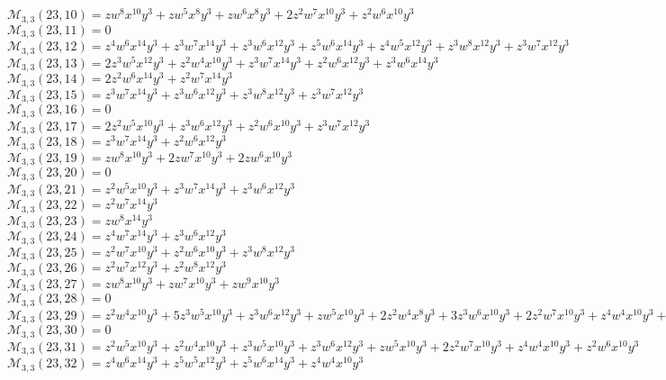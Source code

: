 \documentclass[12pt]{memoireuqam1.3}
\begin{document}
$\mathcal{M}_{3,3}(23,10)=zw^8x^{10}y^3+zw^5x^8y^3+zw^6x^8y^3+2z^2w^7x^{10}y^3+z^2w^6x^{10}y^3$\\
$\mathcal{M}_{3,3}(23,11)=0$\\
$\mathcal{M}_{3,3}(23,12)=z^4w^6x^{14}y^3+z^3w^7x^{14}y^3+z^3w^6x^{12}y^3+z^5w^6x^{14}y^3+z^4w^5x^{12}y^3+z^3w^8x^{12}y^3+z^3w^7x^{12}y^3$\\
$\mathcal{M}_{3,3}(23,13)=2z^3w^5x^{12}y^3+z^2w^4x^{10}y^3+z^3w^7x^{14}y^3+z^2w^6x^{12}y^3+z^3w^6x^{14}y^3$\\
$\mathcal{M}_{3,3}(23,14)=2z^2w^6x^{14}y^3+z^2w^7x^{14}y^3$\\
$\mathcal{M}_{3,3}(23,15)=z^3w^7x^{14}y^3+z^3w^6x^{12}y^3+z^3w^8x^{12}y^3+z^3w^7x^{12}y^3$\\
$\mathcal{M}_{3,3}(23,16)=0$\\
$\mathcal{M}_{3,3}(23,17)=2z^2w^5x^{10}y^3+z^3w^6x^{12}y^3+z^2w^6x^{10}y^3+z^3w^7x^{12}y^3$\\
$\mathcal{M}_{3,3}(23,18)=z^3w^7x^{14}y^3+z^2w^6x^{12}y^3$\\
$\mathcal{M}_{3,3}(23,19)=zw^8x^{10}y^3+2zw^7x^{10}y^3+2zw^6x^{10}y^3$\\
$\mathcal{M}_{3,3}(23,20)=0$\\
$\mathcal{M}_{3,3}(23,21)=z^2w^5x^{10}y^3+z^3w^7x^{14}y^3+z^3w^6x^{12}y^3$\\
$\mathcal{M}_{3,3}(23,22)=z^2w^7x^{14}y^3$\\
$\mathcal{M}_{3,3}(23,23)=zw^8x^{14}y^3$\\
$\mathcal{M}_{3,3}(23,24)=z^4w^7x^{14}y^3+z^3w^6x^{12}y^3$\\
$\mathcal{M}_{3,3}(23,25)=z^2w^7x^{10}y^3+z^2w^6x^{10}y^3+z^3w^8x^{12}y^3$\\
$\mathcal{M}_{3,3}(23,26)=z^2w^7x^{12}y^3+z^2w^8x^{12}y^3$\\
$\mathcal{M}_{3,3}(23,27)=zw^8x^{10}y^3+zw^7x^{10}y^3+zw^9x^{10}y^3$\\
$\mathcal{M}_{3,3}(23,28)=0$\\
$\mathcal{M}_{3,3}(23,29)=z^2w^4x^{10}y^3+5z^3w^5x^{10}y^3+z^3w^6x^{12}y^3+zw^5x^{10}y^3+2z^2w^4x^8y^3+3z^3w^6x^{10}y^3+2z^2w^7x^{10}y^3+z^4w^4x^{10}y^3+z^2w^5x^8y^3$\\
$\mathcal{M}_{3,3}(23,30)=0$\\
$\mathcal{M}_{3,3}(23,31)=z^2w^5x^{10}y^3+z^2w^4x^{10}y^3+z^3w^5x^{10}y^3+z^3w^6x^{12}y^3+zw^5x^{10}y^3+2z^2w^7x^{10}y^3+z^4w^4x^{10}y^3+z^2w^6x^{10}y^3$\\
$\mathcal{M}_{3,3}(23,32)=z^4w^6x^{14}y^3+z^5w^5x^{12}y^3+z^5w^6x^{14}y^3+z^4w^4x^{10}y^3$\\
\end{document}
